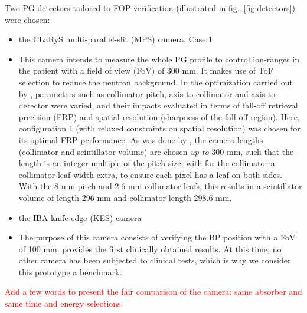 \documentclass[a4paper,english]{article}
\begin{document}
Two PG detectors tailored to FOP verification (illustrated in fig.~\ref{fig:detectors}) were chosen:
\begin{itemize}[noitemsep]
\item the CLaRyS multi-parallel-slit (MPS) camera, Case 1 \citep{Pinto2014a}
\item[] This camera intends to measure the whole PG profile to control ion-ranges in the patient with a field of view (FoV) of 300 mm. It makes use of ToF selection to reduce the neutron background. In the optimization carried out by \cite{Pinto2014a}, parameters such as collimator pitch, axis-to-collimator and axis-to-detector were varied, and their impacts evaluated in terms of fall-off retrieval precision (FRP) and spatial resolution (sharpness of the fall-off region). Here, configuration 1 (with relaxed constraints on spatial resolution) was chosen for its optimal FRP performance. As was done by \cite{Pinto2014a}, the camera lengths (collimator and scintillator volume) are chosen \emph{up to} 300 mm, such that the length is an integer multiple of the pitch size, with for the collimator a collimator-leaf-width extra, to ensure each pixel has a leaf on both sides. With the 8 mm pitch and 2.6 mm collimator-leafs, this results in a scintillator volume of length 296 mm and collimator length 298.6 mm.
\item the IBA knife-edge (KES) camera \citep{Perali2014,Sterpin2015}
\item[] The purpose of this camera consists of verifying the BP position with a FoV of 100 mm. \cite{Richter2016} provides the first clinically obtained results. At this time, no other camera has been subjected to clinical tests, which is why we consider this prototype a benchmark.
\end{itemize}

\textcolor{red}{Add a few words to present the fair comparison of the camera: same absorber and same time and energy selections.}
\end{document}
